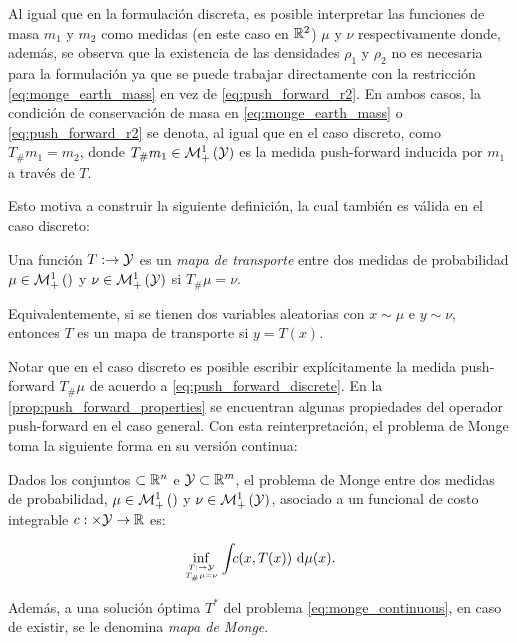 Al igual que en la formulación discreta, es posible interpretar las funciones de masa $m_1$ y $m_2$ como medidas (en este caso en $\mathbb{R}^2$) $\mu$ y $\nu$ respectivamente donde, además, se observa que la existencia de las densidades $\rho_1$ y $\rho_2$ no es necesaria para la formulación ya que se puede trabajar directamente con la restricción \eqref{eq:monge_earth_mass} en vez de \eqref{eq:push_forward_r2}. En ambos casos, la condición de conservación de masa en \eqref{eq:monge_earth_mass} o \eqref{eq:push_forward_r2} se denota, al igual que en el caso discreto, como $T_\#m_1 = m_2$, donde $T_\# m_1\in\mathcal{M}_+^1\left(\mathcal{Y}\right)$ es la medida push-forward inducida por $m_1$ a través de $T$.

Esto motiva a construir la siguiente definición, la cual también es válida en el caso discreto:

\begin{defn}
	Una función $T:\to\mathcal{Y}$ es un \textit{mapa de transporte} entre dos medidas de probabilidad $\mu\in\mathcal{M}_+^1\left(\right)$ y $\nu\in\mathcal{M}_+^1\left(\mathcal{Y}\right)$ si $T_\#\mu = \nu$.
	
	Equivalentemente, si se tienen dos variables aleatorias con $x\sim\mu$ e $y\sim\nu$, entonces $T$ es un mapa de transporte si $y=T(x)$.
\end{defn}

Notar que en el caso discreto es posible escribir explícitamente la medida push-forward $T_\#\mu$ de acuerdo a \eqref{eq:push_forward_discrete}. En la \autoref{prop:push_forward_properties} se encuentran algunas propiedades del operador push-forward en el caso general. Con esta reinterpretación, el problema de Monge toma la siguiente forma en su versión continua:

\begin{defn}
	Dados los conjuntos $\subset\mathbb{R}^n$ e $\mathcal{Y}\subset\mathbb{R}^m$, el problema de Monge entre dos medidas de probabilidad, $\mu\in\mathcal{M}_+^1\left(\right)$ y $\nu\in\mathcal{M}_+^1\left(\mathcal{Y}\right)$, asociado a un funcional de costo integrable $c:\times\mathcal{Y}\to\mathbb{R}$ es:

	\begin{equation}
		\label{eq:monge_continuous}
		\inf_{\feasible{T:\xspace\to\yspace}{T_\#\mu=\nu}}
		\int_{\xspace} c(x, T(x)) \d\mu(x).
	\end{equation}

	Además, a una solución óptima $T^*$ del problema \eqref{eq:monge_continuous}, en caso de existir, se le denomina \textit{mapa de Monge}.
\end{defn}

